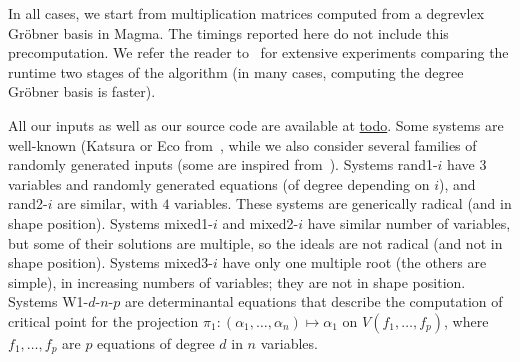 \documentclass[12pt]{article}
\begin{document}
In all cases, we start from multiplication matrices computed from a
{degrevlex} Gr\"obner basis in Magma. The timings reported here do not
include this precomputation. We refer the reader to~\cite{FaMo17} for
extensive experiments comparing the runtime two stages of the
algorithm (in many cases, computing the degree Gr\"obner basis is
faster). 

All our inputs as well as our source code are available at
\url{todo}. Some systems are well-known (Katsura or Eco
from~\cite{Morgan88}, while we also consider several families of
randomly generated inputs (some are inspired
from~\cite{FaMo17}). Systems rand1-$i$ have $3$ variables and randomly
generated equations (of degree depending on $i$), and rand2-$i$ are
similar, with $4$ variables. These systems are generically radical
(and in shape position). Systems mixed1-$i$ and mixed2-$i$ have
similar number of variables, but some of their solutions are multiple,
so the ideals are not radical (and not in shape position). Systems
mixed3-$i$ have only one multiple root (the others are simple), in
increasing numbers of variables; they are not in shape
position. Systems W1-$d$-$n$-$p$ are determinantal equations that
describe the computation of critical point for the projection $\pi_1:
(\alpha_1,\dots,\alpha_n) \mapsto \alpha_1$ on $V(f_1,\dots,f_p)$,
where $f_1,\dots,f_p$ are $p$ equations of degree $d$ in $n$
variables.
\end{document}
